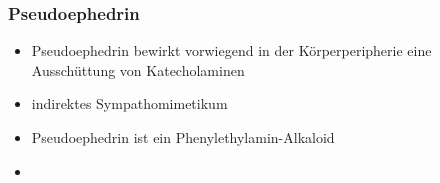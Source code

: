 \begin{frame}[t]
  \frametitle{Pseudoephedrin}
  \begin{itemize}
    \item Pseudoephedrin bewirkt vorwiegend in der Körperperipherie eine Ausschüttung von Katecholaminen \footnotemark 
    \item indirektes Sympathomimetikum
    \item Pseudoephedrin ist ein Phenylethylamin-Alkaloid 
    \item {}
 
  \end{itemize}
\end{frame}


